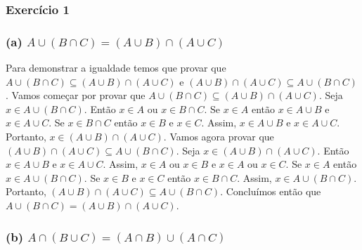 \subsubsection{Exercício 1}

\subsubsection*{(a) $A \cup (B \cap C) = (A \cup B)  \cap (A \cup C)$}

\begin{spacing}{1.5}

Para demonstrar a igualdade temos que provar que $A \cup (B \cap C) \subseteq (A \cup B)  \cap (A \cup C)$ e $(A \cup B)  \cap (A \cup C) \subseteq A \cup (B \cap C)$. Vamos começar por provar que $A \cup (B \cap C) \subseteq (A \cup B)  \cap (A \cup C)$. Seja $x \in A \cup (B \cap C)$. Então $x \in A$ ou $x \in B \cap C$. Se $x \in A$ então $x \in A \cup B$ e $x \in A \cup C$. Se $x \in B \cap C$ então $x \in B$ e $x \in C$. Assim, $x \in A \cup B$ e $x \in A \cup C$. Portanto, $x \in (A \cup B)  \cap (A \cup C)$. Vamos agora provar que $(A \cup B)  \cap (A \cup C) \subseteq A \cup (B \cap C)$. Seja $x \in (A \cup B)  \cap (A \cup C)$. Então $x \in A \cup B$ e $x \in A \cup C$. Assim, $x \in A$ ou $x \in B$ e $x \in A$ ou $x \in C$. Se $x \in A$ então $x \in A \cup (B \cap C)$. Se $x \in B$ e $x \in C$ então $x \in B \cap C$. Assim, $x \in A \cup (B \cap C)$. Portanto, $(A \cup B)  \cap (A \cup C) \subseteq A \cup (B \cap C)$. Concluímos então que $A \cup (B \cap C) = (A \cup B)  \cap (A \cup C)$.
\end{spacing}

\subsubsection*{(b) $A \cap (B \cup C) = (A \cap B) \cup (A \cap C)$}
